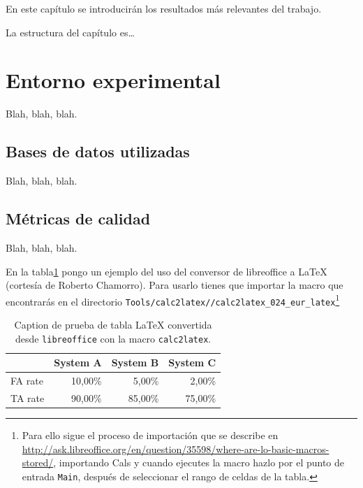 \documentclass[spanish,openright]{book}
\begin{document}
En este capítulo se introducirán los resultados más relevantes del
trabajo.

La estructura del capítulo es\ldots


\section{Entorno experimental}
\label{sec:entorno-experimental}

Blah, blah, blah.


\subsection{Bases de datos utilizadas}
\label{sec:bases-de-datos-1}

Blah, blah, blah.


\subsection{Métricas de calidad}
\label{sec:metricas-de-calidad}

Blah, blah, blah.

En la tabla\ref{pruebaCalc2LaTeX} pongo un ejemplo del uso del conversor
de libreoffice a \LaTeX{} (cortesía de Roberto Chamorro). Para usarlo
tienes que importar la macro que encontrarás en el directorio
\texttt{Tools/calc2latex//calc2latex\_024\_eur\_latex}\footnote{Para
ello sigue el proceso de importación que se describe en
\url{http://ask.libreoffice.org/en/question/35598/where-are-lo-basic-macros-stored/},
importando Cals
y cuando ejecutes la macro hazlo por el punto de entrada
\texttt{Main}, después de seleccionar el rango de celdas de la tabla.}

\begin{table}[htbp]
\caption{Caption de prueba de tabla LaTeX convertida desde
\texttt{libreoffice} con la macro \texttt{calc2latex}.}
\begin{center}
\begin{tabular}{|l|r|r|r|}
\hline
& \multicolumn{1}{l|}{System A} & \multicolumn{1}{l|}{System B} & \multicolumn{1}{l|}{System C} \\ \hline
FA rate & 10,00\% & 5,00\% & 2,00\% \\ \hline
TA rate & 90,00\% & 85,00\% & 75,00\% \\ \hline
\end{tabular}
\end{center}
\label{pruebaCalc2LaTeX}
\end{table}
\end{document}
